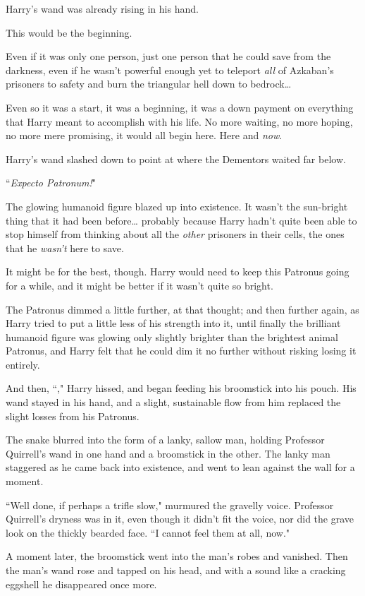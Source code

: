 Harry's wand was already rising in his hand.

This would be the beginning.

Even if it was only one person, just one person that he could save from the darkness, even if he wasn't powerful enough yet to teleport \emph{all} of Azkaban's prisoners to safety and burn the triangular hell down to bedrock{\ldots}

Even so it was a start, it was a beginning, it was a down payment on everything that Harry meant to accomplish with his life. No more waiting, no more hoping, no more mere promising, it would all begin here. Here and \emph{now}.

Harry's wand slashed down to point at where the Dementors waited far below.

``\emph{Expecto Patronum!}"

The glowing humanoid figure blazed up into existence. It wasn't the sun-bright thing that it had been before{\ldots} probably because Harry hadn't quite been able to stop himself from thinking about all the \emph{other} prisoners in their cells, the ones that he \emph{wasn't} here to save.

It might be for the best, though. Harry would need to keep this Patronus going for a while, and it might be better if it wasn't quite so bright.

The Patronus dimmed a little further, at that thought; and then further again, as Harry tried to put a little less of his strength into it, until finally the brilliant humanoid figure was glowing only slightly brighter than the brightest animal Patronus, and Harry felt that he could dim it no further without risking losing it entirely.

And then, ``," Harry hissed, and began feeding his broomstick into his pouch. His wand stayed in his hand, and a slight, sustainable flow from him replaced the slight losses from his Patronus.

The snake blurred into the form of a lanky, sallow man, holding Professor Quirrell's wand in one hand and a broomstick in the other. The lanky man staggered as he came back into existence, and went to lean against the wall for a moment.

``Well done, if perhaps a trifle slow," murmured the gravelly voice. Professor Quirrell's dryness was in it, even though it didn't fit the voice, nor did the grave look on the thickly bearded face. ``I cannot feel them at all, now."

A moment later, the broomstick went into the man's robes and vanished. Then the man's wand rose and tapped on his head, and with a sound like a cracking eggshell he disappeared once more.

